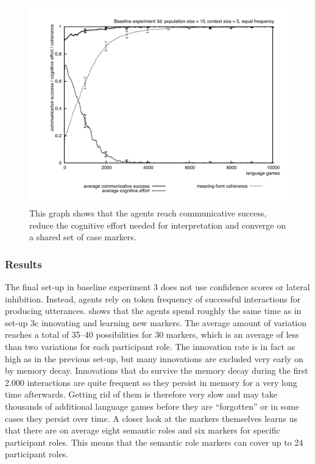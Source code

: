 \begin{figure}[ht]
\centerline{\includegraphics[width=\textwidth]{Chapter3/figs/graph-base3-effort3d}}
  \caption[Baseline experiment 3d: success, effort and coherence]{This graph shows that the agents reach communicative success, reduce the cognitive effort needed for interpretation and converge on a shared set of case markers.}
   \label{f:base3-effort3d}
\end{figure}

\subsubsection{Results}
 The final set-up in baseline experiment 3 does not use confidence scores or lateral inhibition. Instead, agents rely on token frequency of successful interactions for producing utterances.  shows that the agents spend roughly the same time as in set-up 3c innovating and learning new markers. The average amount of variation reaches a total of 35--40 possibilities for 30 markers, which is an average of less than two variations for each participant role. The innovation rate is in fact as high as in the previous set-up, but many innovations are excluded very early on by memory decay. Innovations that do survive the memory decay during the first 2.000 interactions are quite frequent so they persist in memory for a very long time afterwards. Getting rid of them is therefore very slow and may take thousands of additional language games before they are ``forgotten'' or in some cases they persist over time. A closer look at the markers themselves learns us that there are on average eight semantic roles and six markers for specific participant roles. This means that the semantic role markers can cover up to 24 participant roles.

